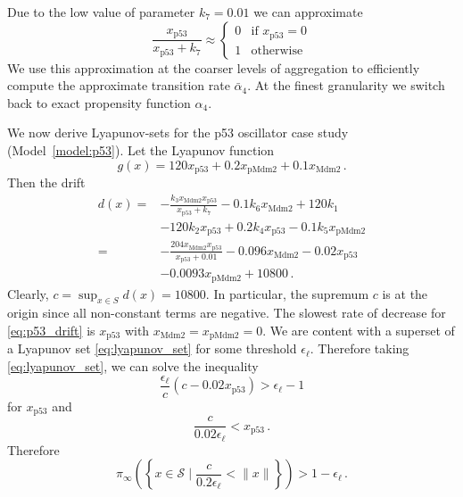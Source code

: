 Due to the low value of parameter $k_7=0.01$ we can approximate
\[\frac{x_{\mathrm{p53}}}{x_{\mathrm{p53}} + k_7}
\approx
\begin{cases}
0 & \text{if } x_{\mathrm{p53}} = 0\\
1 & \text{otherwise}
\end{cases}
\]
We use this approximation at the coarser levels of aggregation to efficiently compute the approximate transition rate $\bar{\alpha}_4$.
At the finest granularity we switch back to exact propensity function $\alpha_4$.

We now derive Lyapunov-sets for the p53 oscillator case study (Model~\ref{model:p53}). Let the Lyapunov function
\begin{equation}
    g(x) = 120 x_{\mathrm{p53}} + 0.2 x_{\mathrm{pMdm2}} + 0.1 x_{\mathrm{Mdm2}}\,.
\end{equation}
Then the drift
\begin{equation}\label{eq:p53_drift}
\begin{split}
    d(x) = & - \frac{k_3 x_{\mathrm{Mdm2}} x_{\mathrm{p53}}}{x_{\mathrm{p53}} + k_7}
            - 0.1 k_6 x_{\mathrm{Mdm2}}
            + 120 k_1 \\
          & - 120 k_2 x_{\mathrm{p53}}
            + 0.2 k_4 x_{\mathrm{p53}}
            - 0.1 k_5 x_{\mathrm{pMdm2}}  \\
        = & - \frac{204 x_{\mathrm{Mdm2}} x_{\mathrm{p53}}}{x_{\mathrm{p53}} + 0.01}
            - 0.096 x_{\mathrm{Mdm2}}
            - 0.02 x_{\mathrm{p53}} \\
            &- 0.0093 x_{\mathrm{pMdm2}}
	    + \num{10800}\,. 
\end{split}
\end{equation}
Clearly, $c = \sup_{x\in{S}} d(x) = \num{10800}$.
In particular, the supremum $c$ is at the origin since all non-constant terms are negative.
The slowest rate of decrease for \eqref{eq:p53_drift} is $x_{\mathrm{p53}}$ with $x_{\mathrm{Mdm2}} = x_{\mathrm{pMdm2}} = 0$.
We are content with a superset of a Lyapunov set \eqref{eq:lyapunov_set} for some threshold $\epsilon_{\ell}$.
Therefore taking \eqref{eq:lyapunov_set}, we can solve the inequality
\[
	\frac{\epsilon_{\ell}}{c}(c - \num{0.02} x_{\mathrm{p53}}) > \epsilon_{\ell} - 1
\]
for $x_{\mathrm{p53}}$ and 
\begin{equation*}
    \frac{c}{0.02 \epsilon_{\ell}} < x_{\mathrm{p53}}\,.
\end{equation*}
Therefore
\begin{equation*}
\pi_{\infty}\left(\left\{x\in\mathcal{S} \mid \frac{c}{0.2\epsilon_{\ell}} < \lVert x \rVert \right\}\right) > 1 - \epsilon_{\ell}\,.
\end{equation*}


